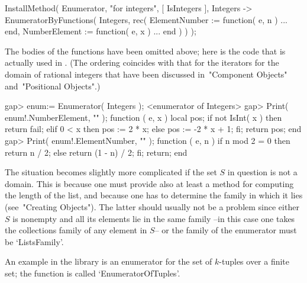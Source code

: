 \begintt
InstallMethod( Enumerator,
    "for integers",
    [ IsIntegers ],
    Integers -> EnumeratorByFunctions( Integers, rec(
                    ElementNumber := function( e, n ) ... end,
                    NumberElement := function( e, x ) ... end ) ) );
\endtt

The bodies of the functions have been omitted above;
here is the code that is actually used in {\GAP}.
(The ordering coincides with that for the iterators for the domain of
rational integers that have been discussed in~"Component Objects"
and~"Positional Objects".)

\beginexample
gap> enum:= Enumerator( Integers );
<enumerator of Integers>
gap> Print( enum!.NumberElement, "\n" );
function ( e, x )
    local  pos;
    if not IsInt( x )  then
        return fail;
    elif 0 < x  then
        pos := 2 * x;
    else
        pos := -2 * x + 1;
    fi;
    return pos;
end
gap> Print( enum!.ElementNumber, "\n" );
function ( e, n )
    if n mod 2 = 0  then
        return n / 2;
    else
        return (1 - n) / 2;
    fi;
    return;
end
\endexample

The situation becomes slightly more complicated if the set $S$ in question
is not a domain.
This is because one must provide also at least a method for computing the
length of the list, and because one has to determine the family in which
it lies (see~"Creating Objects").
The latter should usually not be a problem since either $S$ is nonempty and
all its elements lie in the same family --in this case one takes the
collections family of any element in $S$-- or the family of the enumerator
must be `ListsFamily'.

An example in the {\GAP} library is an enumerator for the set of $k$-tuples
over a finite set; the function is called `EnumeratorOfTuples'.

